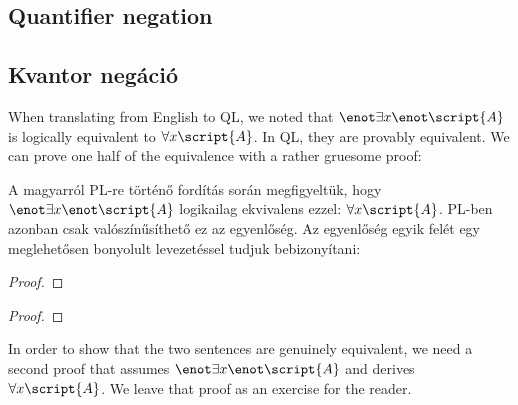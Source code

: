 \subsection{Quantifier negation}
\subsection{Kvantor negáció}


When translating from English to QL, we noted that $\enot\exists x\enot\script{A}$ is logically equivalent to $\forall x\script{A}$. In QL, they are provably equivalent. We can prove one half of the equivalence with a rather gruesome proof:

A magyarról PL-re történő fordítás során megfigyeltük, hogy $\enot\exists x\enot\script{A}$ logikailag ekvivalens ezzel: $\forall x\script{A}$. PL-ben azonban csak valószínűsíthető ez az egyenlőség. Az egyenlőség egyik felét egy meglehetősen bonyolult levezetéssel tudjuk bebizonyítani:

\begin{proof}
	 
	\open
		\open
			\open
			\close
		\close
	\close
\end{proof}

\begin{proof}
	 
	\open
		\open
			\open
			\close
		\close
	\close
\end{proof}

In order to show that the two sentences are genuinely equivalent, we need a second proof that assumes $\enot\exists x\enot\script{A}$ and derives $\forall x\script{A}$. We leave that proof as an exercise for the reader.

